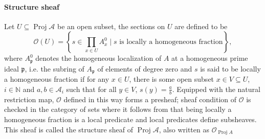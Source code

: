 \documentclass[a4paper,UKenglish,cleveref, autoref, thm-restate]{lipics-v2021}
\begin{document}
\paragraph*{Structure sheaf}
Let $U\subseteq \operatorname{Proj}\mathcal{A}$ be an open subset, the sections on $U$ are defined to be
\[
    \mathcal{O}(U) = \left\{s \in \prod_{x\in U}A_x^0\mid s\text{~is locally a homogeneous fraction}\right\},   
\]
where $A^0_{\mathfrak{p}}$ denotes the homogeneous localization of $A$ at a homogeneous prime ideal $\mathfrak{p}$, i.e. the subring of $A_{\mathfrak{p}}$ of elements of degree zero and $s$ is said to be locally a homogeneous fraction if for any $x \in U$, there is some open subset $x\in V \subseteq U$, $i\in\mathbb{N}$ and $a, b\in\mathcal{A}_i$ such that for all $y\in V$, $s(y)=\frac{a}{b}$. Equipped with the natural restriction map, $\mathcal{O}$ defined in this way forms a presheaf; sheaf condition of $\mathcal{O}$ is checked in the category of sets where it follows from that being locally a homogeneous fraction is a local predicate and local predicates define subsheaves. This sheaf is called the structure sheaf of $\operatorname{Proj}\mathcal{A}$, also written as $\mathcal{O}_{\operatorname{Proj} A}$
\end{document}
